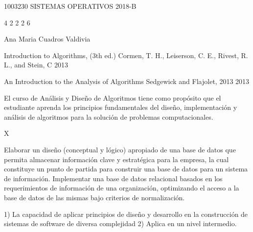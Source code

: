 \documentclass[12pt]{article}
\begin{document}
\sylabusHeader
\sylabusTitle

\curso
{1003230} %
{SISTEMAS OPERATIVOS} %
{2018-B} %

\creditosHoras
{4} %
{2} %
{2} %
{} %
{2} %
{6} %

\instructor
{Ana Maria Cuadros Valdivia}

\libro
{Introduction to Algorithms, (3th ed.)} %
{Cormen, T. H., Leiserson, C. E., Rivest, R. L., and Stein, C} %
{2013} %

\libroSecundario
{An Introduction to the Analysis of Algorithms} %
{Sedgewick and Flajolet, 2013} %
{2013} %

\begin{datosCurso}
    \begin{descripcion}
        El curso de Análisis y Diseño de Algoritmos tiene como propósito que el estudiante aprenda los principios fundamentales del diseño, implementación y análisis de algoritmos  para la solución de problemas computacionales.
        
    \end{descripcion}
    \begin{requisitos}
        
    \end{requisitos}
    \ObligatorioElectivo
    {X} %
    {} %
\end{datosCurso}

\begin{objetivosCurso}
    \begin{resultadosEspecificos}
        Elaborar un diseño (conceptual y lógico) apropiado de una base de datos que permita almacenar información clave y estratégica para la empresa, la cual constituye un punto de partida para  construir una base de datos para un sistema de información. Implementar una base de datos relacional basados en los requerimientos de información de una organización, optimizando el acceso a la base de datos de las mismas bajo criterios de normalización.
    \end{resultadosEspecificos}
    \begin{resultadosEstudiante}
        1) La capacidad de aplicar principios de diseño y desarrollo en la construcción de sistemas de software de diversa complejidad 2) Aplica en un nivel intermedio.
    \end{resultadosEstudiante}
\end{objetivosCurso}

\begin{ListaTemas}
\end{ListaTemas}
\end{document}
